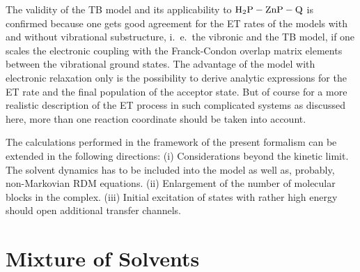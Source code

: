 \documentclass[12pt,twoside,a4paper]{report}
\begin{document}
The validity of the TB model and 
its applicability to  ${\rm H_2P}-{\rm ZnP}-{\rm Q}$
is confirmed because
one gets good agreement for the ET rates of
the models with and without vibrational substructure, i.\ e.\ the vibronic
and the TB model, if one scales the electronic coupling with the
Franck-Condon overlap matrix elements between the vibrational ground
states.  The advantage of the model with electronic relaxation only is the
possibility to derive analytic expressions for the ET rate and the final
population of the acceptor state.  But of course for a more realistic
description of the ET process in such complicated systems as
discussed here, more than one reaction coordinate should be taken into
account.  




The calculations performed in the framework of the present formalism
can be extended in the following directions:
(i)   Considerations beyond the kinetic limit.
      The solvent dynamics has to be included into the model 
      as well as, probably, 
      non-Markovian RDM equations.
(ii)  Enlargement of the number of molecular blocks in the complex.
(iii) Initial excitation of states with  rather high energy
      should open additional transfer channels.



%
\chapter{Mixture of Solvents} \label{mix-of-solvents}                       
%
 
\end{document}
